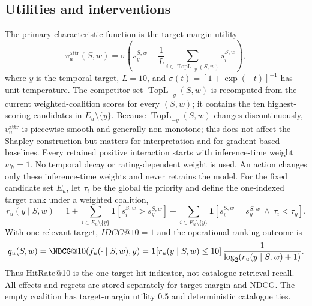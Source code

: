 \documentclass[manuscript,screen,review,anonymous]{acmart}
\begin{document}
\subsection{Utilities and interventions}
The primary characteristic function is the target-margin utility
\begin{equation}
v_u^{\mathrm{attr}}(S,w)=\sigma\left(s_y^{S,w}-\frac{1}{L}\sum_{i\in\operatorname{TopL}_{-y}(S,w)}s_i^{S,w}\right),
\end{equation}
where $y$ is the temporal target, $L=10$, and $\sigma(t)=[1+\exp(-t)]^{-1}$ has unit temperature. The competitor set $\operatorname{TopL}_{-y}(S,w)$ is recomputed from the current weighted-coalition scores for every $(S,w)$; it contains the ten highest-scoring candidates in $E_u\setminus\{y\}$. Because $\operatorname{TopL}_{-y}(S,w)$ changes discontinuously, $v_u^{\mathrm{attr}}$ is piecewise smooth and generally non-monotone; this does not affect the Shapley construction but matters for interpretation and for gradient-based baselines. Every retained positive interaction starts with inference-time weight $w_h=1$. No temporal decay or rating-dependent weight is used. An action changes only these inference-time weights and never retrains the model. For the fixed candidate set $E_u$, let $\tau_i$ be the global tie priority and define the one-indexed target rank under a weighted coalition,
\begin{equation}
r_u(y\mid S,w)=1+\sum_{i\in E_u\setminus\{y\}}\mathbf{1}[s_i^{S,w}>s_y^{S,w}]
+\sum_{i\in E_u\setminus\{y\}}\mathbf{1}[s_i^{S,w}=s_y^{S,w}\ \wedge\ \tau_i<\tau_y].
\end{equation}
With one relevant target, $IDCG@10=1$ and the operational ranking outcome is
\begin{equation}
q_u(S,w)=\NDCG@10(f_u(\cdot\mid S,w),y)=\mathbf{1}[r_u(y\mid S,w)\le10]\,\frac{1}{\log_2(r_u(y\mid S,w)+1)}.
\label{eq:ndcg-one-target}
\end{equation}
Thus HitRate@10 is the one-target hit indicator, not catalogue retrieval recall.
All effects and regrets are stored separately for target margin and NDCG. The empty coalition has target-margin utility $0.5$ and deterministic catalogue ties.
\end{document}
